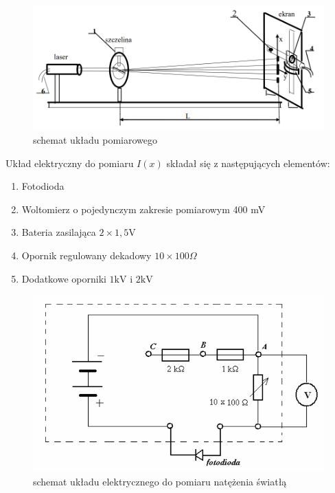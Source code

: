 \documentclass{fizykalab}
\begin{document}
\begin{figure}[H]
    \centering
    \includegraphics[width=1\linewidth]{uklad_pomiarowy.png}
    \caption{schemat układu pomiarowego}
    \label{fig:enter-label}
\end{figure}

\newpage
Układ elektryczny do pomiaru $I(x)$ składał się z następujących elementów:
\begin{enumerate}
    \item Fotodioda
    \item Woltomierz o pojedynczym zakresie pomiarowym 400 mV
    \item Bateria zasilająca $2 \times 1,5 \text{V}$
    \item Opornik regulowany dekadowy $10 \times 100 \Omega$
    \item Dodatkowe oporniki $1 \text{kV}$ i $2 \text{kV}$
\end{enumerate}

\begin{figure}[H]
    \centering
    \includegraphics[width=0.75\linewidth]{uklad_elektryczny.png}
    \caption{schemat układu elektrycznego do pomiaru natężenia światłą}
    \label{fig:enter-label}
\end{figure}
\end{document}
